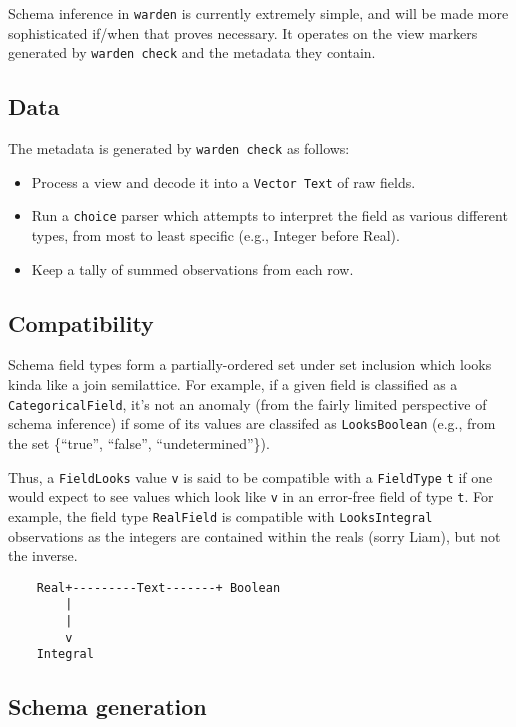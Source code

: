\documentclass[a4paper]{article}
\begin{document}
Schema inference in \texttt{warden} is currently extremely simple, and will be
made more sophisticated if/when that proves necessary. It operates on
the view markers generated by \texttt{warden\ check} and the metadata
they contain.

\subsection{Data}\label{data}

The metadata is generated by \texttt{warden\ check} as follows:

\begin{itemize}
\item
  Process a view and decode it into a \texttt{Vector\ Text} of raw
  fields.
\item
  Run a \texttt{choice} parser which attempts to interpret the field as
  various different types, from most to least specific (e.g., Integer
  before Real).
\item
  Keep a tally of summed observations from each row.
\end{itemize}

\subsection{Compatibility}\label{compatibility}

Schema field types form a partially-ordered set under set inclusion
which looks kinda like a join semilattice. For example, if a given field
is classified as a \texttt{CategoricalField}, it's not an anomaly (from
the fairly limited perspective of schema inference) if some of its
values are classifed as \texttt{LooksBoolean} (e.g., from the set
\{``true'', ``false'', ``undetermined''\}).

Thus, a \texttt{FieldLooks} value \texttt{v} is said to be compatible
with a \texttt{FieldType} \texttt{t} if one would expect to see values
which look like \texttt{v} in an error-free field of type \texttt{t}.
For example, the field type \texttt{RealField} is compatible with
\texttt{LooksIntegral} observations as the integers are contained within
the reals (sorry Liam), but not the inverse.

\begin{verbatim}
    Real+---------Text-------+ Boolean
        |
        |
        v
    Integral
\end{verbatim}

\subsection{Schema generation}\label{schema-generation}
\end{document}
